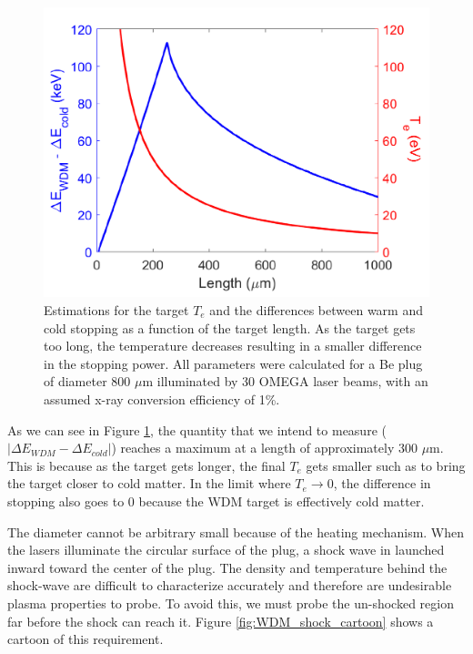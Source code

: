 \begin{figure}[!h]
    \centering
    \includegraphics[scale=0.7]{Figures/wdmTeEstimation.pdf}
    \caption[WDM Target Te vs Length]{Estimations for the target $T_e$ and the differences between warm and cold stopping as a function of the target length. As the target gets too long, the temperature decreases resulting in a smaller difference in the stopping power. All parameters were calculated for a Be plug of diameter 800 $\mu$m illuminated by 30 OMEGA laser beams, with an assumed x-ray conversion efficiency of 1\%.}
    \label{fig:wdmTeEstimation}
\end{figure}

As we can see in Figure \ref{fig:wdmTeEstimation}, the quantity that we intend to measure ($|\Delta E_{WDM} - \Delta E_{cold}|$) reaches a maximum at a length of approximately 300 $\mu$m. This is because as the target gets longer, the final $T_e$ gets smaller such as to bring the target closer to cold matter. In the limit where $T_e \xrightarrow{} 0$, the difference in stopping also goes to 0 because the WDM target is effectively cold matter. 

The diameter cannot be arbitrary small because of the heating mechanism. When the lasers illuminate the circular surface of the plug, a shock wave in launched inward toward the center of the plug. The density and temperature behind the shock-wave are difficult to characterize accurately and therefore are undesirable plasma properties to probe. To avoid this, we must probe the un-shocked region far before the shock can reach it. Figure \ref{fig:WDM_shock_cartoon} shows a cartoon of this requirement.

